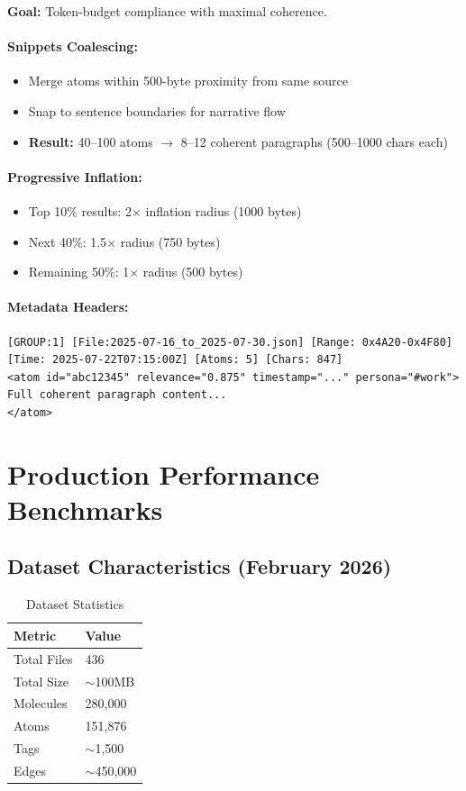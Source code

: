 \documentclass[11pt]{article}
\begin{document}
\textbf{Goal:} Token-budget compliance with maximal coherence.

\paragraph{Snippets Coalescing:}
\begin{itemize}
    \item Merge atoms within 500-byte proximity from same source
    \item Snap to sentence boundaries for narrative flow
    \item \textbf{Result:} 40--100 atoms $\to$ 8--12 coherent paragraphs (500--1000 chars each)
\end{itemize}

\paragraph{Progressive Inflation:}
\begin{itemize}
    \item Top 10\% results: 2$\times$ inflation radius (1000 bytes)
    \item Next 40\%: 1.5$\times$ radius (750 bytes)
    \item Remaining 50\%: 1$\times$ radius (500 bytes)
\end{itemize}

\paragraph{Metadata Headers:}
\begin{verbatim}
[GROUP:1] [File:2025-07-16_to_2025-07-30.json] [Range: 0x4A20-0x4F80] 
[Time: 2025-07-22T07:15:00Z] [Atoms: 5] [Chars: 847]
<atom id="abc12345" relevance="0.875" timestamp="..." persona="#work">
Full coherent paragraph content...
</atom>
\end{verbatim}

\section{Production Performance Benchmarks}
\label{sec:benchmarks}

\subsection{Dataset Characteristics (February 2026)}

\begin{table}[h]
\centering
\caption{Dataset Statistics}
\label{tab:dataset}
\begin{tabular}{@{}ll@{}}
\toprule
\textbf{Metric} & \textbf{Value} \\ \midrule
Total Files & 436 \\
Total Size & $\sim$100MB \\
Molecules & 280,000 \\
Atoms & 151,876 \\
Tags & $\sim$1,500 \\
Edges & $\sim$450,000 \\ \bottomrule
\end{tabular}
\end{table}
\end{document}
